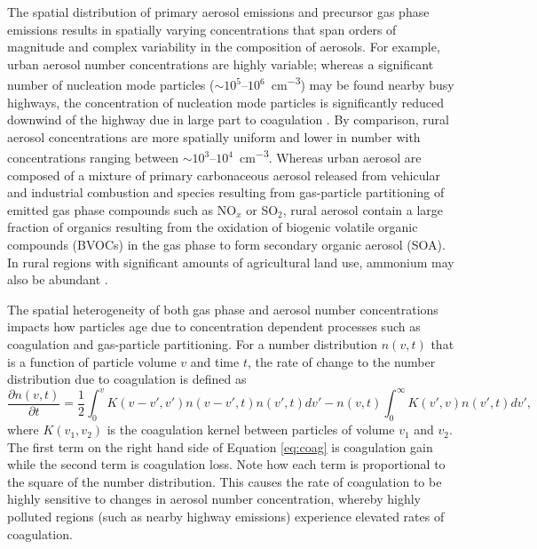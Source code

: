 The spatial distribution of primary aerosol emissions and precursor gas phase emissions results in spatially varying concentrations that span orders of magnitude and complex variability in the composition of aerosols. For example, urban aerosol number concentrations are highly variable; whereas a significant number of nucleation mode particles ($\sim10^5$--$10^6$~\si{cm^{-3}}) may be found nearby busy highways, the concentration of nucleation mode particles is significantly reduced downwind of the highway due in large part to coagulation \parencite{zhu_study_2002}. By comparison, rural aerosol concentrations are more spatially uniform and lower in number with concentrations ranging between $\sim10^3$--$10^4$~\si{cm^{-3}}. Whereas urban aerosol are composed of a mixture of primary carbonaceous aerosol released from vehicular and industrial combustion and species resulting from gas-particle partitioning of emitted gas phase compounds such as NO$_x$ or SO$_2$, rural aerosol contain a large fraction of organics resulting from the oxidation of biogenic volatile organic compounds (BVOCs) in the gas phase to form secondary organic aerosol (SOA). In rural regions with significant amounts of agricultural land use, ammonium may also be abundant \parencite{seinfeld_atmospheric_1998}. 

The spatial heterogeneity of both gas phase and aerosol number concentrations impacts how particles age due to concentration dependent processes such as coagulation and gas-particle partitioning. For a number distribution $n(v,t)$ that is a function of particle volume $v$ and time $t$, the rate of change to the number distribution due to coagulation is defined as 
\begin{equation}
\frac{\partial n(v, t)}{\partial t} = \frac{1}{2}\int_0^{v}K(v-v', v')n(v-v', t)n(v', t)dv' - n(v,t)\int_0^{\infty}K(v',v)n(v',t)dv',
\label{eq:coag}
\end{equation}
where $K(v_1, v_2)$ is the coagulation kernel between particles of volume $v_1$ and $v_2$. The first term on the right hand side of Equation \ref{eq:coag} is coagulation gain while the second term is coagulation loss. Note how each term is proportional to the square of the number distribution. This causes the rate of coagulation to be highly sensitive to changes in aerosol number concentration, whereby highly polluted regions (such as nearby highway emissions) experience elevated rates of coagulation. 

